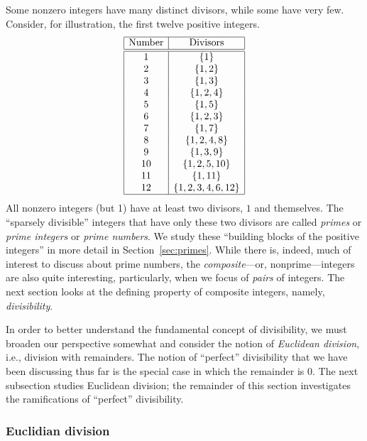 Some nonzero integers have many distinct divisors, while some have
very few.  Consider, for illustration, the first twelve positive
integers.
\[ \begin{array}{|c|c|}
\hline
\mbox{Number} & \mbox{Divisors} \\
\hline
\hline
1  &  \{ 1 \} \\
2  &  \{ 1, 2 \} \\
3  &  \{ 1, 3 \} \\
4  &  \{ 1, 2, 4 \} \\
5  &  \{ 1, 5 \} \\
6  &  \{ 1, 2, 3 \} \\
7  &  \{ 1, 7 \} \\
8  &  \{ 1, 2, 4, 8 \} \\
9  &  \{ 1, 3, 9 \} \\
10  & \{ 1, 2, 5, 10 \} \\
11  & \{ 1, 11 \} \\
12  & \{ 1, 2, 3, 4, 6, 12 \} \\
\hline
\end{array}
\]
All nonzero integers (but 1) have at least two divisors, $1$ and themselves.
The ``sparsely divisible'' integers that have only these two divisors
are called {\it primes} or {\it prime
  integers} or {\it prime numbers}.  We study these ``building blocks
of the positive integers'' in more detail in Section~\ref{sec:primes}.
While there is, indeed, much of interest to discuss about prime
numbers, the  {\it composite}---or,
nonprime---integers are also quite interesting, particularly, when we
focus of {\em pairs} of integers.  The next section looks at the
defining property of composite integers, namely, {\em divisibility}.

\medskip

In order to better understand the fundamental concept of divisibility,
we must broaden our perspective somewhat and consider the notion of
{\em Euclidean division},  i.e., division
with remainders.  The notion of ``perfect'' divisibility that we have
been discussing thus far is the special case in which the remainder is
$0$.  The next subsection studies Euclidean division; the remainder of
this section investigates the ramifications of ``perfect''
divisibility.

\subsubsection{Euclidian division}
\label{sec:euclidian}

